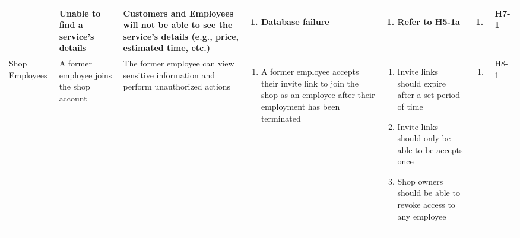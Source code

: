 \documentclass{article}
\begin{document}
\begin{landscape}
\begin{table}[H]
\begin{adjustbox}{width=\paperwidth}
\begin{tabular}{|p{}|p{}|p{}|p{}|p{}|p{}|p{}|}
				~
				 & Unable to find a service's details
				 & Customers and Employees will not be able to see the service's details (e.g., price, estimated time, etc.)
				 & \begin{enumerate}[label=\alph*., leftmargin=*]
					   \item Database failure
				   \end{enumerate}
				 & \begin{enumerate}[label=\alph*., leftmargin=*]
					   \item Refer to H5-1a
				   \end{enumerate}
				 & \begin{enumerate}[label=\alph*., leftmargin=*]
					   \item
				   \end{enumerate}
				 & H7-1                                                                                                        \\
				\hline
				Shop Employees
				 & A former employee joins the shop account
				 & The former employee can view sensitive information and perform unauthorized actions
				 & \begin{enumerate}[label=\alph*., leftmargin=*]
					   \item A former employee accepts their invite link to join the shop as an employee after their employment
					         has been terminated
				   \end{enumerate}
				 & \begin{enumerate}[label=\alph*., leftmargin=*]
					   \item Invite links should expire after a set period of time
					   \item Invite links should only be able to be accepts once
					   \item Shop owners should be able to revoke access to any employee
				   \end{enumerate}
				 & \begin{enumerate}[label=\alph*., leftmargin=*]
					   \item
				   \end{enumerate}
				 & H8-1                                                                                                        \\
				\hline
			\end{tabular}
		\end{adjustbox}
	\end{table}
\end{landscape}
\end{document}
